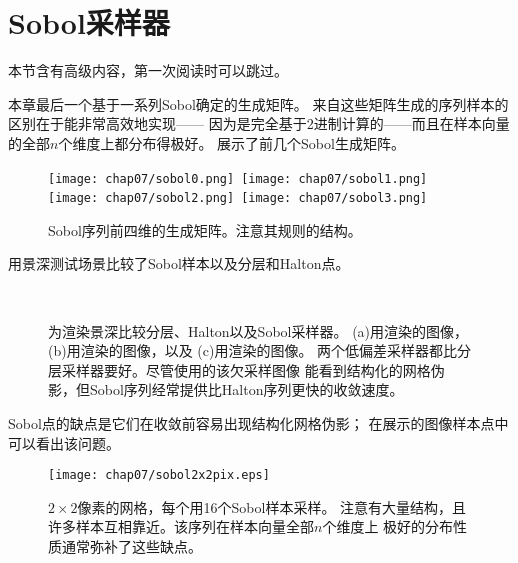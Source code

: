 \section{Sobol采样器}\label{sec:Sobol采样器}
\begin{remark}
    本节含有高级内容，第一次阅读时可以跳过。
\end{remark}

本章最后一个基于一系列Sobol确定的生成矩阵。
来自这些矩阵生成的序列样本的区别在于能非常高效地实现——
因为是完全基于2进制计算的——而且在样本向量的全部$n$个维度上都分布得极好。
展示了前几个Sobol生成矩阵。
\begin{figure}[htbp]
    \centering
    \texttt{[image: chap07/sobol0.png]}\,
    \texttt{[image: chap07/sobol1.png]}\,
    \texttt{[image: chap07/sobol2.png]}\,
    \texttt{[image: chap07/sobol3.png]}
    \caption{Sobol序列前四维的生成矩阵。注意其规则的结构。}
    \label{fig:7.34}
\end{figure}

用景深测试场景比较了Sobol样本以及分层和Halton点。
\begin{figure}[htbp]
    \,
    \\
    \caption{为渲染景深比较分层、Halton以及Sobol采样器。
        (a)用渲染的图像，
        (b)用渲染的图像，以及
        (c)用渲染的图像。
        两个低偏差采样器都比分层采样器要好。尽管使用的该欠采样图像
        能看到结构化的网格伪影，但Sobol序列经常提供比Halton序列更快的收敛速度。}
    \label{fig:7.35}
\end{figure}

Sobol点的缺点是它们在收敛前容易出现结构化网格伪影；
在展示的图像样本点中可以看出该问题。
\begin{figure}[htbp]
    \centering\texttt{[image: chap07/sobol2x2pix.eps]}
    \caption{$2\times2$像素的网格，每个用16个Sobol样本采样。
        注意有大量结构，且许多样本互相靠近。该序列在样本向量全部$n$个维度上
        极好的分布性质通常弥补了这些缺点。}
    \label{fig:7.36}
\end{figure}

